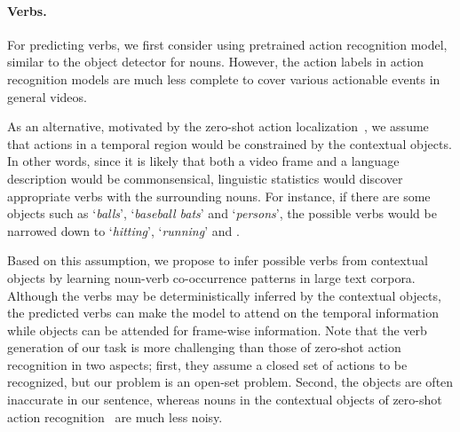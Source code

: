 \vspace{-1em}\paragraph{Verbs.}
For predicting verbs, we first consider using pretrained action recognition model, similar to the object detector for nouns.
However, the action labels in action recognition models are much less complete to cover various actionable events in general videos.

As an alternative, motivated by the zero-shot action localization~\cite{jain2015objects2action}, we assume that actions in a temporal region would be constrained by the contextual objects.
In other words, since it is likely that both a video frame and a language description would be commonsensical, linguistic statistics would discover appropriate verbs with the surrounding nouns.
For instance, if there are some objects such as `\emph{balls}', `\emph{baseball bats}' and `\emph{persons}', the possible verbs would be narrowed down to `\emph{hitting}', `\emph{running}' and \etc.

Based on this assumption, we propose to infer possible verbs from contextual objects by learning noun-verb co-occurrence patterns in large text corpora.
Although the verbs may be deterministically inferred by the contextual objects, the predicted verbs can make the model to attend on the temporal information while objects can be attended for frame-wise information.
Note that the verb generation of our task is more challenging than those of zero-shot action recognition in two aspects;
first, they assume a closed set of actions to be recognized, but our problem is an open-set problem. 
Second, the objects are often inaccurate in our sentence, whereas nouns in the contextual objects of zero-shot action recognition~\cite{jain2015objects2action} are much less noisy.

